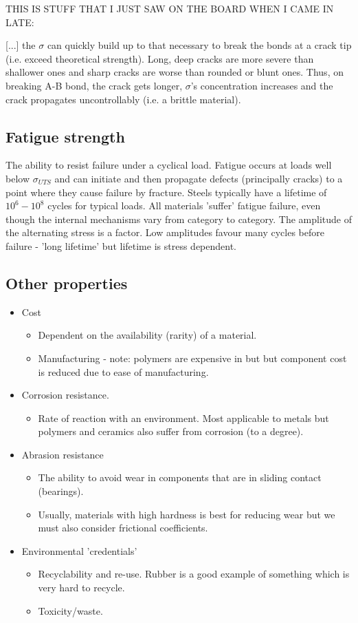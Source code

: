 \documentclass[class=report, crop=false, 12pt,a4paper]{standalone}
\begin{document}
THIS IS STUFF THAT I JUST SAW ON THE BOARD WHEN I CAME IN LATE:

[...] the \(\sigma\) can quickly build up to that necessary to break the bonds at a crack tip (i.e. exceed theoretical strength). Long, deep cracks are more severe than shallower ones and sharp cracks are worse than rounded or blunt ones. Thus, on breaking A-B bond, the crack gets longer, \(\sigma\)'s concentration increases and the crack propagates uncontrollably (i.e. a brittle material).
\subsection{Fatigue strength}
The ability to resist failure under a cyclical load. Fatigue occurs at loads well below \(\sigma_{UTS}\) and can initiate and then propagate defects (principally cracks) to a point where they cause failure by fracture. Steels typically have a lifetime of \(10^6 - 10^8\) cycles for typical loads. All materials 'suffer' fatigue failure, even though the internal mechanisms vary from category to category. The amplitude of the alternating stress is a factor. Low amplitudes favour many cycles before failure - 'long lifetime' but lifetime is stress dependent.
\subsection{Other properties}
\begin{itemize}[noitemsep]
  \item Cost
  \begin{itemize}
    \item Dependent on the availability (rarity) of a material. 
    \item Manufacturing - note: polymers are expensive in but but component cost is reduced due to ease of manufacturing.
  \end{itemize}
  \item Corrosion resistance.
  \begin{itemize}
    \item Rate of reaction with an environment. Most applicable to metals but polymers and ceramics also suffer from corrosion (to a degree).
  \end{itemize}
  \item Abrasion resistance
  \begin{itemize} 
    \item The ability to avoid wear in components that are in sliding contact (bearings). 
    \item Usually, materials with high hardness is best for reducing wear but we must also consider frictional coefficients.
  \end{itemize}
  \item Environmental 'credentials'
  \begin{itemize}
    \item Recyclability and re-use. Rubber is a good example of something which is very hard to recycle.
    \item Toxicity/waste.
  \end{itemize}
\end{itemize}
\end{document}
